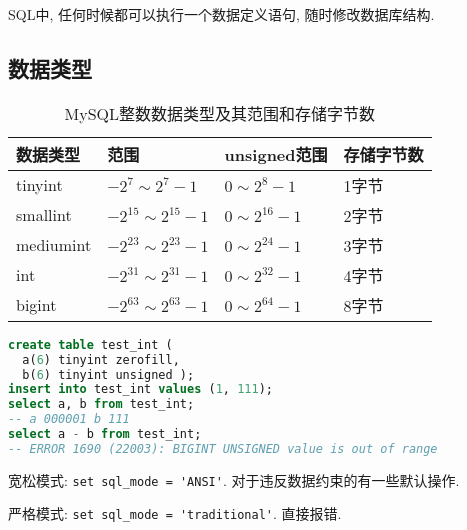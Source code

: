 SQL中, 任何时候都可以执行一个数据定义语句, 随时修改数据库结构.

\subsection{数据类型}

\begin{table}[H]
\centering
\label{tab:mysql_int_types}
\begin{tabular}{|l|l|l|l|}
\hline
\textbf{数据类型} & \textbf{范围} & \textbf{unsigned范围} & \textbf{存储字节数} \\ \hline
tinyint & $-2^7 \sim 2^7 - 1$ & $0 \sim 2^8 - 1$ & 1字节 \\ \hline
smallint & $-2^{15} \sim 2^{15} - 1$ & $0 \sim 2^{16} - 1$ & 2字节 \\ \hline
mediumint & $-2^{23} \sim 2^{23} - 1$ & $0 \sim 2^{24} - 1$ & 3字节 \\ \hline
int & $-2^{31} \sim 2^{31} - 1$ & $0 \sim 2^{32} - 1$ & 4字节 \\ \hline
bigint & $-2^{63} \sim 2^{63} - 1$ & $0 \sim 2^{64} - 1$ & 8字节 \\ \hline
\end{tabular}
\caption{MySQL整数数据类型及其范围和存储字节数}
\end{table}

\begin{lstlisting}[language=SQL]
create table test_int (
  a(6) tinyint zerofill,
  b(6) tinyint unsigned );
insert into test_int values (1, 111);
select a, b from test_int;
-- a 000001 b 111
select a - b from test_int;
-- ERROR 1690 (22003): BIGINT UNSIGNED value is out of range
\end{lstlisting}

宽松模式: \verb|set sql_mode = 'ANSI'|. 对于违反数据约束的有一些默认操作.

严格模式: \verb|set sql_mode = 'traditional'|. 直接报错.

